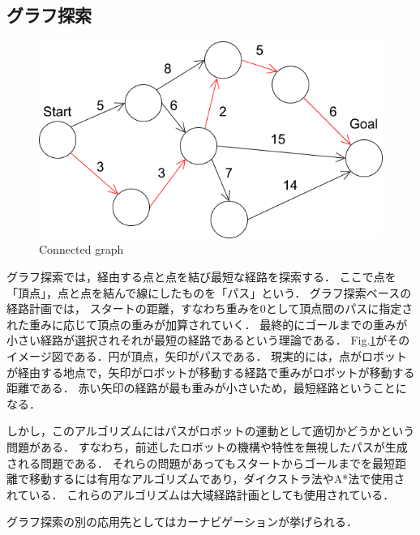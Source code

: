 
\subsection{グラフ探索}

\begin{figure}[hbtp]
  \centering
 \includegraphics[keepaspectratio, scale=0.6]
      {images/png/Dijkstra.drawio.png}
 \caption{Connected graph}
 \label{Fig:Dijkstra}
\end{figure}

グラフ探索では，経由する点と点を結び最短な経路を探索する．
ここで点を「頂点」，点と点を結んで線にしたものを「パス」という．
グラフ探索ベースの経路計画では，
スタートの距離，すなわち重みを0として頂点間のパスに指定された重みに応じて頂点の重みが加算されていく．
最終的にゴールまでの重みが小さい経路が選択されそれが最短の経路であるという理論である．
Fig.\ref{Fig:Dijkstra}がそのイメージ図である．円が頂点，矢印がパスである．
現実的には，点がロボットが経由する地点で，矢印がロボットが移動する経路で重みがロボットが移動する距離である．
赤い矢印の経路が最も重みが小さいため，最短経路ということになる．

しかし，このアルゴリズムにはパスがロボットの運動として適切かどうかという問題がある．
すなわち，前述したロボットの機構や特性を無視したパスが生成される問題である．
それらの問題があってもスタートからゴールまでを最短距離で移動するには有用なアルゴリズムであり，ダイクストラ法やA*法で使用されている．
これらのアルゴリズムは大域経路計画としても使用されている．

グラフ探索の別の応用先としてはカーナビゲーションが挙げられる．
\newpage
